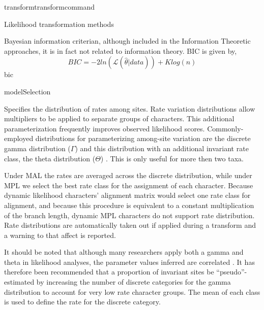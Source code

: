 \begin{command}{transform}{transformcommand}
\begin{arguments}
\begin{argumentgroup}{Likelihood transformation methods}
{\begin{description}
                        { Bayesian information criterian, although included in
                        the Information Theoretic approaches, it is in fact not
                        related to information theory. BIC is given by,
                        \begin{equation*}
                            BIC = - 2 ln(\mathcal{L}(\hat{\theta}|data)) + K log(n)
                        \end{equation*}}
                        {bic}
                \end{description}}
            {modelSelection}


                {Specifies the distribution of rates among sites. Rate
                variation distributions allow multipliers to be applied to
                separate groups of characters. This additional parameterization
                frequently improves observed likelihood scores.
                Commonly-employed distributions for parameterizing among-site
                variation are the discrete gamma distribution ($\Gamma$)
                \cite{yang1994a} and this distribution with an additional
                invariant rate class, the theta distribution ($\Theta$)
                \cite{gu1995}. This is only useful for more then two taxa.
                
                \begin{statement}
                    Under MAL the rates are averaged across the
                    discrete distribution, while under MPL we select the best
                    rate class for the assignment of each character. Because
                    dynamic likelihood characters' alignment matrix would select
                    one rate class for alignment, and because this procedure is equivalent to a
                    constant multiplication of the branch length, dynamic MPL
                    characters do not support rate distribution. Rate distributions are
                    automatically taken out if applied during a transform and a
                    warning to that affect is reported.
                \end{statement}

                \begin{statement}
                    It should be noted that although many researchers apply both
                    a gamma and theta in likelihood analyses, the parameter
                    values inferred are correlated \cite{sullivan1999}.  It has
                    therefore been recommended that a proportion of invariant
                    sites be ``pseudo''-estimated by increasing the number of
                    discrete categories for the gamma distribution to account
                    for very low rate character groups. The mean of each class
                    is used to define the rate for the discrete category.
                \end{statement}

}
\end{argumentgroup}
\end{arguments}
\end{command}
